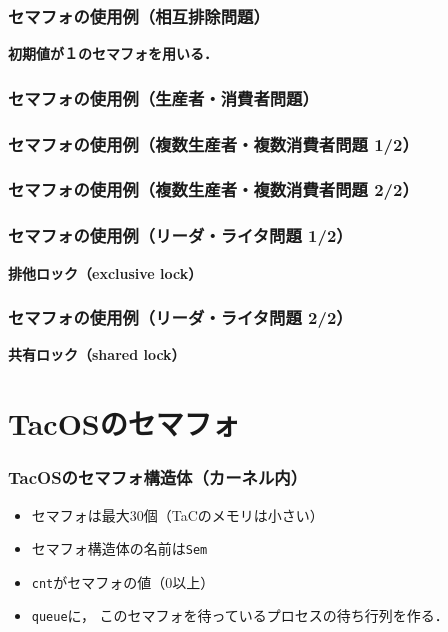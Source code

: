 \documentclass[dvipdfmx]{beamer}
\begin{document}
\begin{frame}
  \frametitle{セマフォの使用例（相互排除問題）}
  
  {\bf 初期値が１のセマフォを用いる．}
\end{frame}

\begin{frame}
  \frametitle{セマフォの使用例（生産者・消費者問題）}
  
\end{frame}

\begin{frame}
  \frametitle{セマフォの使用例（複数生産者・複数消費者問題 1/2）}
  
\end{frame}

\begin{frame}
  \frametitle{セマフォの使用例（複数生産者・複数消費者問題 2/2）}
  
\end{frame}

\begin{frame}
  \frametitle{セマフォの使用例（リーダ・ライタ問題 1/2）}
  
  {\bf 排他ロック（exclusive lock）}
\end{frame}

\begin{frame}
  \frametitle{セマフォの使用例（リーダ・ライタ問題 2/2）}
  
  {\bf 共有ロック（shared lock）}
\end{frame}

\section{TacOSのセマフォ}
\begin{frame}
  \frametitle{TacOSのセマフォ構造体（カーネル内）}
  
  \begin{itemize}
    \item セマフォは最大30個（TaCのメモリは小さい）
    \item セマフォ構造体の名前は{\tt Sem}
    \item {\tt cnt}がセマフォの値（0以上）
    \item {\tt queue}に，
      このセマフォを待っているプロセスの待ち行列を作る．
  \end{itemize}
\end{frame}
\end{document}
